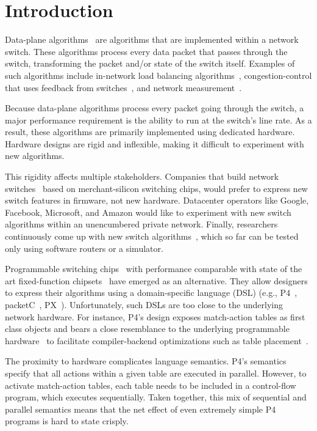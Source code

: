 \section{Introduction}
\label{s:intro}

Data-plane algorithms~\cite{cestan} are algorithms that are implemented within
a network switch. These algorithms process every data packet that passes
through the switch, transforming the packet and/or state of the switch itself.
Examples of such algorithms include in-network load balancing
algorithms~\cite{conga, ecmp}, congestion-control that uses feedback from
switches~\cite{xcp, rcp, pdq, dctcp}, and network measurement~\cite{opensketch,
bitmap_george, elephant_george}.

Because data-plane algorithms process every packet going through the switch, a
major performance requirement is the ability to run at the switch's line rate.
As a result, these algorithms are primarily implemented using dedicated
hardware. Hardware designs are rigid and inflexible, making it difficult to
experiment with new algorithms.

This rigidity affects multiple stakeholders. Companies that build network
switches~\cite{cisco_nexus, dell_force10, arista_7050} based on
merchant-silicon switching chips, would prefer to express new switch features
in firmware, not new hardware.  Datacenter operators like Google, Facebook,
Microsoft, and Amazon would like to experiment with new switch algorithms
within an unencumbered private network.  Finally, researchers continuously come
up with new switch algorithms~\cite{xcp, codel, d3, detail, pdq}, which so far
can be tested only using software routers or a simulator.

Programmable switching chips~\cite{flexpipe, xpliant, rmt} with performance
comparable with state of the art fixed-function chipsets~\cite{trident,
tomahawk, mellanox} have emerged as an alternative.  They allow designers to
express their algorithms using a domain-specific language (DSL) (e.g.,
P4~\cite{p4}, packetC~\cite{packetc}, PX~\cite{px}).  Unfortunately, such DSLs
are too close to the underlying network hardware.  For instance, P4's design
exposes match-action tables as first class objects and bears a close
resemblance to the underlying programmable hardware~\cite{flexpipe, rmt} to
facilitate compiler-backend optimizations such as table
placement~\cite{lavanya_compiler}.

The proximity to hardware complicates language semantics. P4's
semantics~\cite{p4spec} specify that all actions within a given table are
executed in parallel. However, to activate match-action tables, each table
needs to be included in a control-flow program, which executes sequentially.
Taken together, this mix of sequential and parallel semantics means that the
net effect of even extremely simple P4 programs is hard to state crisply.


